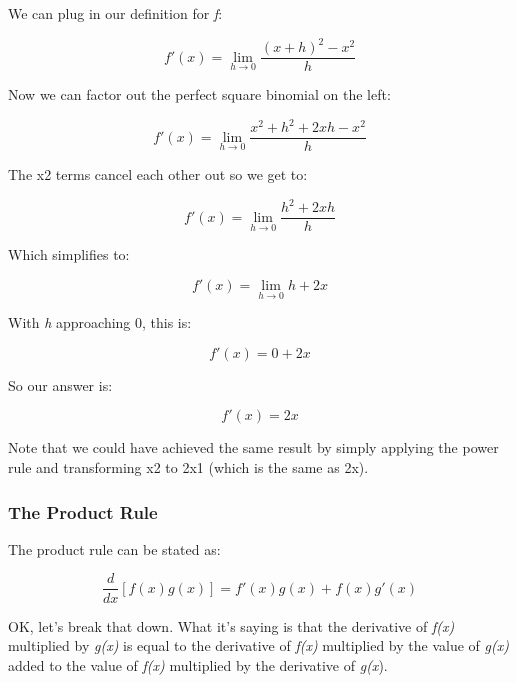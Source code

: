 \documentclass[11pt]{article}
\begin{document}
We can plug in our definition for \emph{f}:

\begin{equation}f'(x) = \lim_{h \to 0} \frac{(x + h)^{2} - x^{2}}{h} \end{equation}

Now we can factor out the perfect square binomial on the left:

\begin{equation}f'(x) = \lim_{h \to 0} \frac{x^{2} + h^{2} + 2xh - x^{2}}{h} \end{equation}

The x2 terms cancel each other out so we get to:

\begin{equation}f'(x) = \lim_{h \to 0} \frac{h^{2} + 2xh}{h} \end{equation}

Which simplifies to:

\begin{equation}f'(x) = \lim_{h \to 0} h + 2x \end{equation}

With \emph{h} approaching 0, this is:

\begin{equation}f'(x) = 0 + 2x \end{equation}

So our answer is:

\begin{equation}f'(x) = 2x \end{equation}

Note that we could have achieved the same result by simply applying the
power rule and transforming x2 to 2x1 (which is the same as 2x).

\subsubsection{The Product Rule}\label{the-product-rule}

The product rule can be stated as:

\begin{equation}\frac{d}{dx}[f(x)g(x)] = f'(x)g(x) + f(x)g'(x) \end{equation}

OK, let's break that down. What it's saying is that the derivative of
\emph{f(x)} multiplied by \emph{g(x)} is equal to the derivative of
\emph{f(x)} multiplied by the value of \emph{g(x)} added to the value of
\emph{f(x)} multiplied by the derivative of \emph{g(x}).
\end{document}
